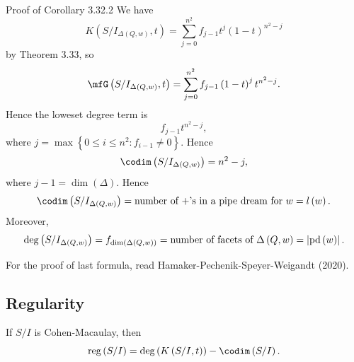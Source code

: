 \documentclass[co439]{subfiles}
\begin{document}
    \begin{boxyproof}{Proof of Corollary 3.32.2}
        We have
        \begin{equation*}
            K\left( S /I_{\Delta\left( Q,w \right)},t \right) = \sum^{n^{2}}_{j=0} f_{j-1} t^j\left( 1-t \right)^{n^{2}-j}
        \end{equation*}
        by Theorem 3.33, so
        \begin{equation*}
            \mfG\left( S /I_{\Delta\left( Q,w \right)},t \right) = \sum^{n^{2}}_{j=0} f_{j-1} \left( 1-t \right)^jt^{n^{2}-j}.
        \end{equation*}
        Hence the loweset degree term is
        \begin{equation*}
            f_{j-1}t^{n^{2}-j},
        \end{equation*}
        where $j = \max\left\lbrace 0\leq i\leq n^{2} : f_{i-1}\neq 0\right\rbrace$. Hence
        \begin{equation*}
            \codim\left( S /I_{\Delta\left( Q,w \right)} \right) = n^{2}-j,
        \end{equation*}
        where $j-1 = \dim\left( \Delta \right)$. Hence
        \begin{equation*}
            \codim\left( S /I_{\Delta\left( Q,w \right)} \right) = \text{number of $+$'s in a pipe dream for $w$} = l\left( w \right).
        \end{equation*}
        Moreover,
        \begin{equation*}
            \deg\left( S /I_{\Delta\left( Q,w \right)} \right) = f_{\dim\left( \Delta\left( Q,w \right) \right)} = \text{number of facets of } \Delta\left( Q,w \right) = \left| \operatorname{pd}\left( w \right) \right|.
        \end{equation*}

        For the proof of last formula, read Hamaker-Pechenik-Speyer-Weigandt (2020).\footnotemark[1]
        
        \noindent
        \begin{minipage}{\textwidth}
        \end{minipage}
    \end{boxyproof}

    \subsection{Regularity}
    
    \begin{theorem}{}
        If $S /I$ is Cohen-Macaulay, then
        \begin{equation*}
            \reg\left( S /I \right) = \deg\left( K\left( S /I, t \right) \right) - \codim\left( S /I \right).
        \end{equation*}
    \end{theorem}
\end{document}
